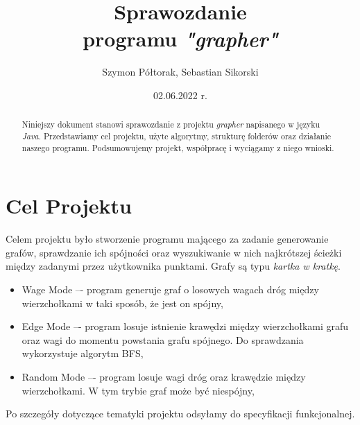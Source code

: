 \documentclass[10pt, a4paper]{report}
\title{\huge{\textbf{Sprawozdanie} \\ programu
      \textit{"grapher"}}}
\author{Szymon Półtorak, Sebastian Sikorski}
\date{02.06.2022 r.}
\begin{document}
\maketitle
\lstset{style=listings}

\begin{abstract}
  Niniejszy dokument stanowi sprawozdanie z projektu \textit{grapher}
  napisanego w języku \textit{Java}.
  Przedstawiamy cel projektu, użyte algorytmy, strukturę folderów oraz
  działanie naszego programu. Podsumowujemy projekt, współpracę i wyciągamy z
  niego wnioski.
\end{abstract}

\renewcommand*\thesection{\arabic{section}}

\pagestyle{fancy}
\fancyhf{}

\tableofcontents
\newpage

\section{Cel Projektu}\label{sec:cel-projektu}
Celem projektu było stworzenie programu mającego za zadanie generowanie grafów,
sprawdzanie ich spójności oraz wyszukiwanie w nich najkrótszej ścieżki między
zadanymi przez użytkownika punktami.
Grafy są typu \textit{kartka w kratkę}.
\begin{itemize}
  \item Wage Mode –- program generuje graf o losowych wagach dróg między
        wierzchołkami w taki sposób, że jest on spójny,
  \item Edge Mode –- program losuje istnienie krawędzi między wierzchołkami
        grafu oraz wagi do momentu powstania
        grafu spójnego. Do sprawdzania wykorzystuje algorytm BFS,
  \item Random Mode –- program losuje wagi dróg oraz krawędzie między
        wierzchołkami. W tym trybie graf może być niespójny,
\end{itemize}
Po szczegóły dotyczące tematyki projektu odsyłamy do specyfikacji
funkcjonalnej.
\end{document}
